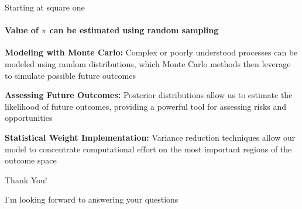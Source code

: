 \documentclass{beamer}
\begin{document}
\begin{frame}{Starting at square one}
  \framesubtitle{Value of $\pi$ can be estimated using random sampling}

  \textbf{Modeling with Monte Carlo:} Complex or poorly understood processes
  can be modeled using random distributions, which Monte Carlo methods then
  leverage to simulate possible future outcomes

  \vspace{0.5cm}

  \textbf{Assessing Future Outcomes:} Posterior distributions allow us to
  estimate the likelihood of future outcomes, providing a powerful tool
  for assessing risks and opportunities

  \vspace{0.5cm}

  \textbf{Statistical Weight Implementation:} Variance reduction techniques
  allow our model to concentrate computational effort on the most important
  regions of the outcome space

  \vspace{0.5cm}
\end{frame}

\begin{frame}{Thank You!}
  \begin{center}
    \Large{I'm looking forward to answering your questions}
  \end{center}
\end{frame}
\end{document}
